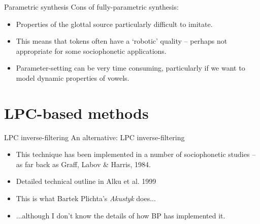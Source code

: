 \documentclass{beamer}
\begin{document}
\begin{frame}{Parametric synthesis}
Cons of fully-parametric synthesis:
\begin{itemize}
\item{Properties of the glottal source particularly difficult to imitate.}
\item{This means that tokens often have a `robotic' quality -- perhaps not appropriate for some sociophonetic applications.}
\item{Parameter-setting can be very time consuming, particularly if we want to model dynamic properties of vowels.}
\end{itemize}
\end{frame}
\section{LPC-based methods}
\begin{frame}{LPC inverse-filtering}
An alternative: LPC inverse-filtering
\begin{itemize}
\item{This technique has been implemented in a number of sociophonetic studies -- as far back as Graff, Labov \& Harris, 1984.}
\item{Detailed technical outline in Alku et al. 1999}
\item{This is what Bartek Plichta's \textit{Akustyk} does...}
\item{...although I don't know the details of how BP has implemented it.}
\end{itemize}
\end{frame}
\end{document}

